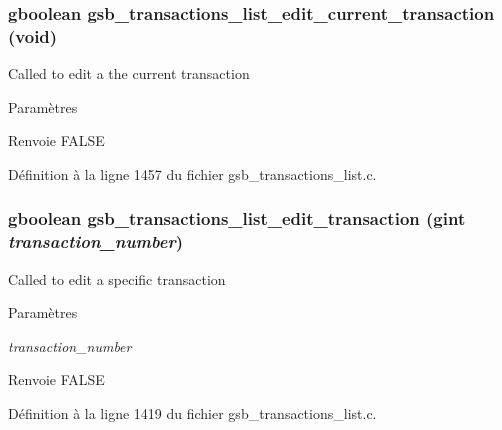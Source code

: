 \subsubsection[{gsb\_\-transactions\_\-list\_\-edit\_\-current\_\-transaction}]{\setlength{\rightskip}{0pt plus 5cm}gboolean gsb\_\-transactions\_\-list\_\-edit\_\-current\_\-transaction (void)}\label{gsb__transactions__list_8c_a78ae21515e884855e82af687571bb3c2}
Called to edit a the current transaction


\begin{DoxyParams}{Paramètres}
\item[{\em }]\end{DoxyParams}
\begin{DoxyReturn}{Renvoie}
FALSE 
\end{DoxyReturn}


Définition à la ligne 1457 du fichier gsb\_\-transactions\_\-list.c.

\subsubsection[{gsb\_\-transactions\_\-list\_\-edit\_\-transaction}]{\setlength{\rightskip}{0pt plus 5cm}gboolean gsb\_\-transactions\_\-list\_\-edit\_\-transaction (gint {\em transaction\_\-number})}\label{gsb__transactions__list_8c_a01ca41bdcf1f932ae3a4289433d64cf5}
Called to edit a specific transaction


\begin{DoxyParams}{Paramètres}
\item[{\em transaction\_\-number}]\end{DoxyParams}
\begin{DoxyReturn}{Renvoie}
FALSE 
\end{DoxyReturn}


Définition à la ligne 1419 du fichier gsb\_\-transactions\_\-list.c.

